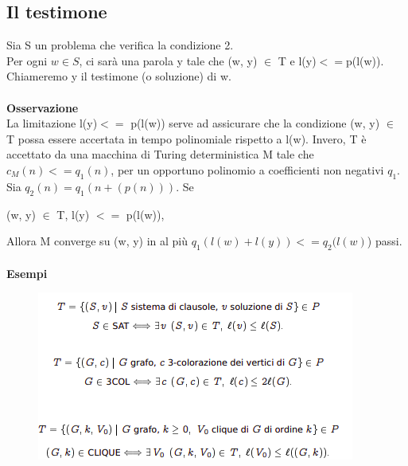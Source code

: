 \subsection{Il testimone}
Sia S un problema che verifica la condizione 2.\\
Per ogni $w \in S$, ci sarà una parola y tale che (w, y) $\in$ T e l(y)$ <= $p(l(w)).
Chiameremo y il testimone (o soluzione) di w.\\\\
\textbf{Osservazione}\\
La limitazione l(y)$ <= $ p(l(w)) serve ad assicurare che la condizione
(w, y) $\in$ T possa essere accertata in tempo polinomiale rispetto a l(w).
Invero, T è accettato da una macchina di Turing deterministica M tale che
$c_M(n) <= q_1(n)$, per un opportuno polinomio a coefficienti non negativi $q_1$.
Sia $q_2(n) = q_1(n + (p(n)))$. Se
\begin{center}
   (w, y) $\in$ T, l(y) $<=$ p(l(w)),
\end{center}
Allora M converge su (w, y) in al più $q_1(l(w) + l(y)) <= q_2(l(w)$) passi.\\\\
\textbf{Esempi}
\begin{figure}[htp]
    \includegraphics[scale=0.9]{tesi_stile/img/foto4cap11.png}
\end{figure}
\newpage
